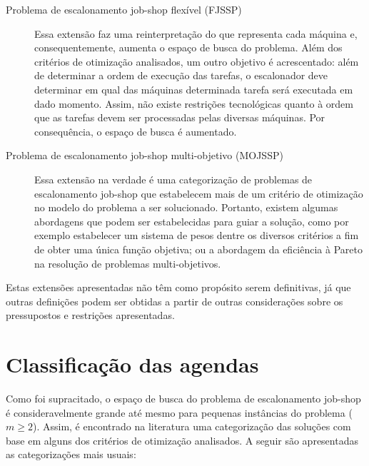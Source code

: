 \documentclass[relatorio,nocolorlinks]{inf-ufg}
\begin{document}
\begin{description}
\item[Problema de escalonamento job-shop flex\'{i}vel (FJSSP)] Essa extens\~{a}o faz uma reinterpreta\c{c}\~{a}o do que representa cada
m\'{a}quina e, consequentemente, aumenta o espa\c{c}o de busca do problema. Al\'{e}m dos crit\'{e}rios de otimiza\c{c}\~{a}o analisados, um
outro objetivo \'{e} acrescentado: al\'{e}m de determinar a ordem de execu\c{c}\~{a}o das tarefas, o escalonador deve determinar em qual
das m\'{a}quinas determinada tarefa ser\'{a} executada em dado momento. Assim, n\~{a}o existe restri\c{c}\~{o}es tecnol\'{o}gicas quanto \`{a}
ordem que as tarefas devem ser processadas pelas diversas m\'{a}quinas. Por consequ\^{e}ncia, o espa\c{c}o de busca \'{e} aumentado.
\cite{Liouane2007} \cite{Saidi2007} \cite{Xing2010} \cite{Zhang2009} \cite{Ma2010} \cite{Zhang2010} \cite{Zhang2010b}

\item[Problema de escalonamento job-shop multi-objetivo (MOJSSP)] Essa extens\~{a}o na verdade \'{e} uma categoriza\c{c}\~{a}o de problemas
de escalonamento job-shop que estabelecem mais de um crit\'{e}rio de otimiza\c{c}\~{a}o no modelo do problema a ser solucionado. Portanto,
existem algumas abordagens que podem ser estabelecidas para guiar a solu\c{c}\~{a}o, como por exemplo estabelecer um sistema de pesos dentre
os diversos crit\'{e}rios a fim de obter uma \'{u}nica fun\c{c}\~{a}o objetiva; ou a abordagem da efici\^{e}ncia \`{a} Pareto na
resolu\c{c}\~{a}o de problemas multi-objetivos. \cite{Adibi2010} \cite{Manikas2009} \cite{Zhang2009} \cite{Zhang2010} \cite{Wang2010}
\end{description}

Estas extens\~{o}es apresentadas n\~{a}o t\^{e}m como prop\'{o}sito serem definitivas, j\'{a} que outras defini\c{c}\~{o}es podem ser obtidas
a partir de outras considera\c{c}\~{o}es sobre os pressupostos e restri\c{c}\~{o}es apresentadas.

\section{Classifica\c{c}\~{a}o das agendas}

Como foi supracitado, o espa\c{c}o de busca do problema de escalonamento job-shop \'{e} consideravelmente grande at\'{e} mesmo para pequenas
inst\^{a}ncias do problema ($m \geq 2$). Assim, \'{e} encontrado na literatura uma categoriza\c{c}\~{a}o das solu\c{c}\~{o}es com base em
alguns dos crit\'{e}rios de otimiza\c{c}\~{a}o analisados. A seguir s\~{a}o apresentadas as categoriza\c{c}\~{o}es mais usuais:
\end{document}
